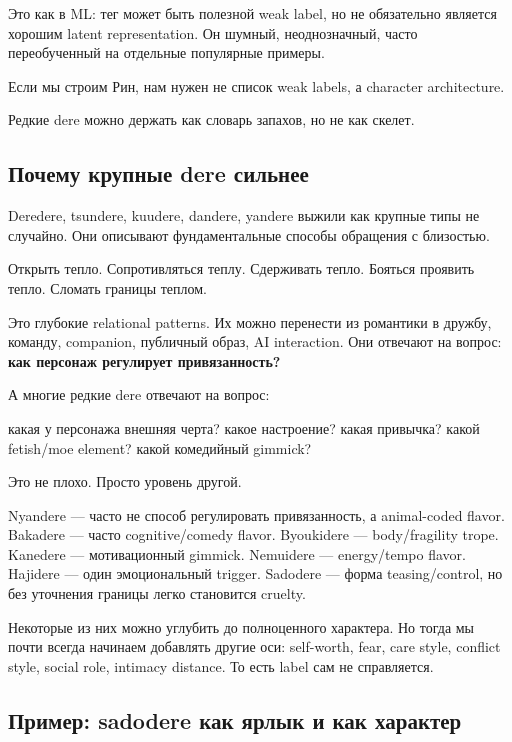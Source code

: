 Это как в ML: тег может быть полезной weak label, но не обязательно
является хорошим latent representation. Он шумный, неоднозначный, часто
переобученный на отдельные популярные примеры.

Если мы строим Рин, нам нужен не список weak labels, а character
architecture.

Редкие dere можно держать как словарь запахов, но не как скелет.

\subsection*{Почему крупные dere сильнее}

Deredere, tsundere, kuudere, dandere, yandere выжили как крупные типы не
случайно. Они описывают фундаментальные способы обращения с близостью.

Открыть тепло. Сопротивляться теплу. Сдерживать тепло. Бояться проявить
тепло. Сломать границы теплом.

Это глубокие relational patterns. Их можно перенести из романтики в
дружбу, команду, companion, публичный образ, AI interaction. Они
отвечают на вопрос: \textbf{как персонаж регулирует привязанность?}

А многие редкие dere отвечают на вопрос:

какая у персонажа внешняя черта? какое настроение? какая привычка? какой
fetish/\hspace{0pt}moe element? какой комедийный gimmick?

Это не плохо. Просто уровень другой.

Nyandere --- часто не способ регулировать привязанность, а animal-coded
flavor. Bakadere --- часто cognitive/\hspace{0pt}comedy flavor. Byoukidere ---
body/\hspace{0pt}fragility trope. Kanedere --- мотивационный gimmick. Nemuidere ---
energy/\hspace{0pt}tempo flavor. Hajidere --- один эмоциональный trigger. Sadodere
--- форма teasing/\hspace{0pt}control, но без уточнения границы легко становится
cruelty.

Некоторые из них можно углубить до полноценного характера. Но тогда мы
почти всегда начинаем добавлять другие оси: self-worth, fear, care
style, conflict style, social role, intimacy distance. То есть label сам
не справляется.

\subsection*{Пример: sadodere как ярлык и как характер}

